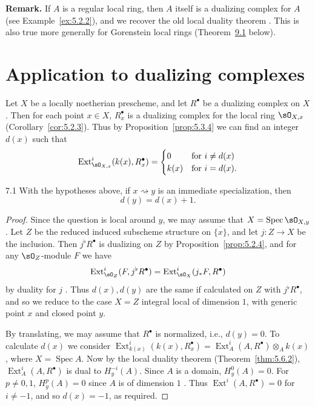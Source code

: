 \par\medskip\noindent\textbf{Remark.}
If $A$ is a regular local ring, then $A$ itself is a dualizing complex for $A$ (see Example~\ref{ex:5.2.2}), and we recover the old local duality theorem \cite[]{LC}. This is also true more generally for Gorenstein local rings (Theorem~\hyperref[thm:5.9.1]{9.1} below).
\par\medskip

\section{Application to dualizing complexes}\label{sec:5.7}

Let $X$ be a locally noetherian prescheme, and let $R^\bullet$ be a dualizing complex on $X$. Then for each point $x\in X$, $R_x^\bullet$ is a dualizing complex for the local ring $\sO_{X,x}$ (Corollary~\ref{cor:5.2.3}). Thus by Proposition~\ref{prop:5.3.4} we can find an integer $d(x)$ such that
\[
\operatorname{Ext}_{\sO_{X,x}}^{i}(k(x), R_{x}^{\bullet}) = \begin{cases} 0 & \text{for } i\neq d(x) \\ k(x) & \text{for } i = d(x). \end{cases}
\]

\begin{bookproposition}{7.1}\label{prop:5.7.1}
With the hypotheses above, if $x\rightsquigarrow y$ is an immediate specialization, then
\[
d(y)=d(x)+1.
\]
\end{bookproposition}

\begin{proof}
Since the question is local around $y$, we may assume that $X=\operatorname{Spec}\sO_{X,y}$. Let $Z$ be the reduced induced subscheme structure on $\overline{\{x\}}$, and let $j\colon Z\to X$ be the inclusion. Then $j^{\flat}R^{\bullet}$ is dualizing on $Z$ by Proposition~\ref{prop:5.2.4}, and for any $\sO_Z$-module $F$ we have
\[
\operatorname{Ext}_{\sO_Z}^{i}(F, j^{\flat}R^{\bullet}) = \operatorname{Ext}_{\sO_X}^{i}(j_{*}F, R^{\bullet})
\]
by duality for $j$ . Thus $d(x),d(y)$ are the same if calculated on $Z$ with $j^{\flat}R^{\bullet}$, and so we reduce to the case $X=Z$ integral local of dimension $1$, with generic point $x$ and closed point $y$.

By translating, we may assume that $R^\bullet$ is normalized, i.e., $d(y)=0$. To calculate $d(x)$ we consider $\operatorname{Ext}_{k(x)}^{i}(k(x),R_x^{\bullet})=\operatorname{Ext}_{A}^{i}(A,R^{\bullet})\otimes_{A} k(x)$, where $X=\operatorname{Spec}A$. Now by the local duality theorem (Theorem~\ref{thm:5.6.2}), $\operatorname{Ext}_{A}^{i}(A,R^{\bullet})$ is dual to $H_{y}^{-i}(A)$. Since $A$ is a domain, $H_{y}^{0}(A)=0$. For $p\neq0,1$, $H_{y}^{p}(A)=0$ since $A$ is of dimension $1$ \cite[]{LC}. Thus $\operatorname{Ext}^{i}(A,R^{\bullet})=0$ for $i\neq-1$, and so $d(x)=-1$, as required.
\end{proof}

